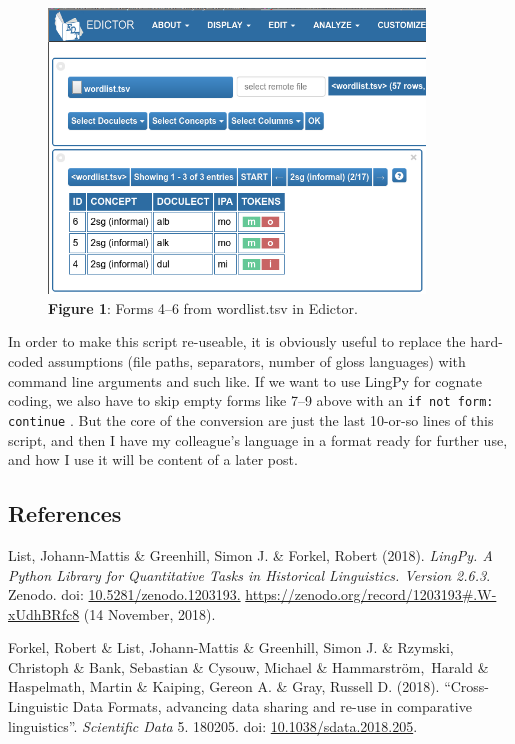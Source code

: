 \documentclass[
  a4paper,
  14pt,
  oneside,
  tablecaptionabove
]{scrbook}
\begin{document}
\begin{figure}[h]
\centering
\includegraphics[width=10cm]{images/alorese.png}
\caption*{\small \textbf{Figure 1}: Forms 4--6 from wordlist.tsv in Edictor.}
\end{figure}

In order to make this script re-useable, it is obviously useful to
replace the hard-coded assumptions (file paths, separators, number of
gloss languages) with command line arguments and such like. If we want
to use LingPy for cognate coding, we also have to skip empty forms like
7--9 above with an \lstinline!if not form: continue! . But the core of
the conversion are just the last 10-or-so lines of this script, and then
I have my colleague's language in a format ready for further use, and
how I use it will be content of a later post.


\subsection*{References}

\nopagebreak\hangindent=0.7cm {\small List, Johann-Mattis \& Greenhill, Simon J. \& Forkel, Robert (2018).
\emph{LingPy. A Python Library for Quantitative Tasks in Historical
Linguistics. Version 2.6.3}.  Zenodo. doi:
\href{https://doi.org/10.5281/zenodo.1203193.}{10.5281/zenodo.1203193.}
\url{https://zenodo.org/record/1203193\#.W-xUdhBRfc8} (14 November,
2018). }

\nopagebreak\hangindent=0.7cm {\small Forkel, Robert \& List, Johann-Mattis \& Greenhill, Simon J. \&
Rzymski, Christoph \& Bank, Sebastian \& Cysouw, Michael \&
Hammarström,~Harald \& Haspelmath, Martin \& Kaiping, Gereon A. \& Gray,
Russell D. (2018). ``Cross-Linguistic Data Formats, advancing data sharing
and re-use in comparative linguistics''. \emph{Scientific Data} 5. 180205.
doi:
\href{https://doi.org/10.1038/sdata.2018.205}{10.1038/sdata.2018.205}. 
}
\end{document}
